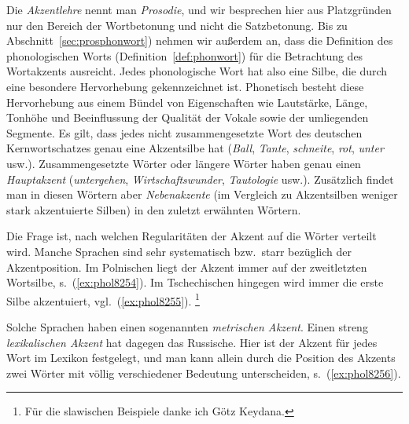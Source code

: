 Die \textit{Akzentlehre} nennt man \textit{Prosodie}, und wir besprechen hier aus Platzgründen nur den Bereich der Wortbetonung und \zB nicht die Satzbetonung.
Bis zu Abschnitt~\ref{sec:prosphonwort}) nehmen wir außerdem an, dass die Definition des phonologischen Worts (Definition~\ref{def:phonwort}) für die Betrachtung des Wortakzents ausreicht.
Jedes phonologische Wort hat also eine Silbe, die durch eine besondere Hervorhebung gekennzeichnet ist.
Phonetisch besteht diese Hervorhebung aus einem Bündel von Eigenschaften wie Lautstärke, Länge, Tonhöhe und Beeinflussung der Qualität der Vokale sowie der umliegenden Segmente.
Es gilt, dass jedes nicht zusammengesetzte Wort des deutschen Kernwortschatzes genau eine Akzentsilbe hat (\textit{\Akz Ball}, \textit{\Akz Tante}, \textit{\Akz schneite}, \textit{\Akz rot}, \textit{\Akz unter} usw.).
Zusammengesetzte Wörter oder längere Wörter haben genau einen \textit{Hauptakzent} (\textit{\Akz untergehen}, \textit{\Akz Wirtschaftswunder}, \textit{Tautolo\Akz gie} usw.).
Zusätzlich findet man in diesen Wörtern aber \textit{Nebenakzente} (im Vergleich zu Akzentsilben weniger stark akzentuierte Silben) in den zuletzt erwähnten Wörtern.


Die Frage ist, nach welchen Regularitäten der Akzent auf die Wörter verteilt wird.
Manche Sprachen sind sehr systematisch bzw.\ starr bezüglich der Akzentposition.
Im Polnischen liegt der Akzent immer auf der zweitletzten Wortsilbe, s.\ (\ref{ex:phol8254}).
Im Tschechischen hingegen wird immer die erste Silbe akzentuiert, vgl.\ (\ref{ex:phol8255}).%
\footnote{Für die slawischen Beispiele danke ich Götz Keydana.}

\begin{exe}
\end{exe}

Solche Sprachen haben einen sogenannten \textit{metrischen Akzent}.
Einen streng \textit{lexikalischen Akzent} hat dagegen das Russische.
Hier ist der Akzent für jedes Wort im Lexikon festgelegt, und man kann allein durch die Position des Akzents zwei Wörter mit völlig verschiedener Bedeutung unterscheiden, s.\ (\ref{ex:phol8256}).

